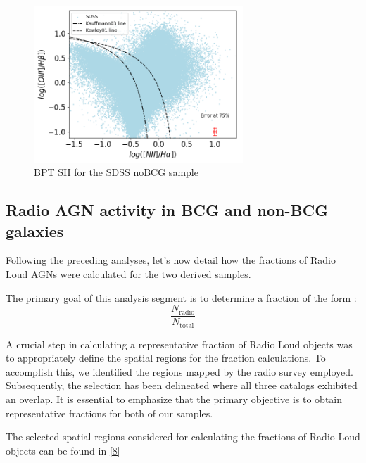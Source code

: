 \begin{figure}[hbtp]
  \centering
  \includegraphics[width=0.7\textwidth]{SDSS-NII-V22}
  \caption{BPT SII for the SDSS noBCG sample }
  \label{7}
\end{figure}

\newpage
\subsection{Radio AGN activity in BCG and non-BCG galaxies}

Following the preceding analyses, let's now detail how the fractions of Radio Loud AGNs were calculated for the two derived samples.

The primary goal of this analysis segment is to determine a fraction of the form :
 $$\frac{N_{\text{radio}}}{N_{\text{total}}}$$

A crucial step in calculating a representative fraction of Radio Loud objects was to appropriately define the spatial regions for the fraction calculations. To accomplish this, we identified the regions mapped by the radio survey employed. Subsequently, the selection has been delineated where all three catalogs exhibited an overlap. It is essential to emphasize that the primary objective is to obtain representative fractions for both of our samples.

The selected spatial regions considered for calculating the fractions of Radio Loud objects can be found in \autoref{8}


